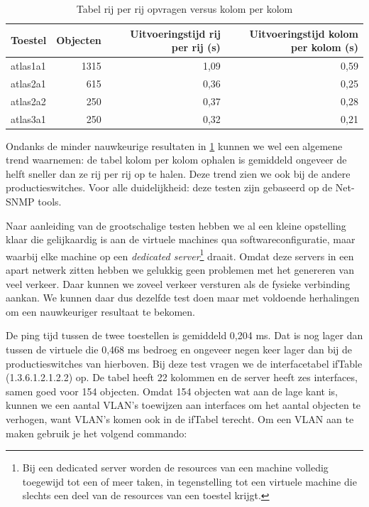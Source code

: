 
\begin{table}[h]
\centering
\begin{tabular}{@{}lrrr@{}}
\toprule
Toestel  & Objecten & Uitvoeringstijd rij per rij (s) & Uitvoeringstijd kolom per kolom (s) \\ \midrule
atlas1a1 & 1315     & 1,09                            & 0,59                                \\
atlas2a1 & 615      & 0,36                            & 0,25                                \\
atlas2a2 & 250      & 0,37                            & 0,28                                \\
atlas3a1 & 250      & 0,32                            & 0,21                                \\ \bottomrule
\end{tabular}
\caption{Tabel rij per rij opvragen versus kolom per kolom}
\label{tabel-serieel-vs-parallel}
\end{table}

Ondanks de minder nauwkeurige resultaten in \cref{tabel-serieel-vs-parallel} kunnen we wel een algemene trend waarnemen:
de tabel kolom per kolom ophalen is gemiddeld ongeveer de helft sneller dan ze rij per rij op te halen.
Deze trend zien we ook bij de andere productieswitches.
Voor alle duidelijkheid: deze testen zijn gebaseerd op de Net-SNMP tools.

Naar aanleiding van de grootschalige testen hebben we al een kleine opstelling klaar die gelijkaardig is aan de virtuele machines qua softwareconfiguratie,
maar waarbij elke machine op een \textit{dedicated server}\footnote{
	Bij een dedicated server worden de resources van een machine volledig toegewijd tot een of meer taken,
	in tegenstelling tot een virtuele machine die slechts een deel van de resources van een toestel krijgt.
} draait.
Omdat deze servers in een apart netwerk zitten hebben we gelukkig geen problemen met het genereren van veel verkeer.
Daar kunnen we zoveel verkeer versturen als de fysieke verbinding aankan.
We kunnen daar dus dezelfde test doen maar met voldoende herhalingen om een nauwkeuriger resultaat te bekomen.

De ping tijd tussen de twee toestellen is gemiddeld 0,204 ms.
Dat is nog lager dan tussen de virtuele die 0,468 ms bedroeg en ongeveer negen keer lager dan bij de productieswitches van hierboven.
Bij deze test vragen we de interfacetabel ifTable (1.3.6.1.2.1.2.2) op.
De tabel heeft 22 kolommen en de server heeft zes interfaces, samen goed voor 154 objecten.
Omdat 154 objecten wat aan de lage kant is,
kunnen we een aantal VLAN's toewijzen aan interfaces om het aantal objecten te verhogen,
want VLAN's komen ook in de ifTabel terecht.
Om een VLAN aan te maken gebruik je het volgend commando:

